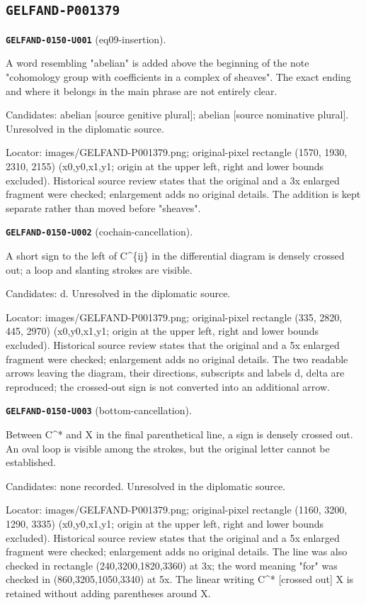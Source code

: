 \documentclass[11pt]{article}
\theoremstyle{definition}
\theoremstyle{remark}
\begin{document}
\subsection*{\texttt{GELFAND-P001379}}
\noindent\leavevmode{}\label{GELFAND-P001379:eq09-insertion:note}\textbf{\texttt{GELFAND-0150-U001}} (eq09-insertion).\par\nopagebreak[4]
A word resembling "abelian" is added above the beginning of the note "cohomology group with coefficients in a complex of sheaves". The exact ending and where it belongs in the main phrase are not entirely clear.\par
Candidates: abelian [source genitive plural]; abelian [source nominative plural]. Unresolved in the diplomatic source.\par
Locator: images/GELFAND-P001379.png; original-pixel rectangle (1570, 1930, 2310, 2155) (x0,y0,x1,y1; origin at the upper left, right and lower bounds excluded). Historical source review states that the original and a 3x enlarged fragment were checked; enlargement adds no original details. The addition is kept separate rather than moved before "sheaves".\par\medskip
\noindent\leavevmode{}\label{GELFAND-P001379:cochain-cancellation:note}\textbf{\texttt{GELFAND-0150-U002}} (cochain-cancellation).\par\nopagebreak[4]
A short sign to the left of C\textasciicircum{}\{ij\} in the differential diagram is densely crossed out; a loop and slanting strokes are visible.\par
Candidates: d. Unresolved in the diplomatic source.\par
Locator: images/GELFAND-P001379.png; original-pixel rectangle (335, 2820, 445, 2970) (x0,y0,x1,y1; origin at the upper left, right and lower bounds excluded). Historical source review states that the original and a 5x enlarged fragment were checked; enlargement adds no original details. The two readable arrows leaving the diagram, their directions, subscripts and labels d, delta are reproduced; the crossed-out sign is not converted into an additional arrow.\par\medskip
\noindent\leavevmode{}\label{GELFAND-P001379:bottom-cancellation:note}\textbf{\texttt{GELFAND-0150-U003}} (bottom-cancellation).\par\nopagebreak[4]
Between C\textasciicircum{}* and X in the final parenthetical line, a sign is densely crossed out. An oval loop is visible among the strokes, but the original letter cannot be established.\par
Candidates: none recorded. Unresolved in the diplomatic source.\par
Locator: images/GELFAND-P001379.png; original-pixel rectangle (1160, 3200, 1290, 3335) (x0,y0,x1,y1; origin at the upper left, right and lower bounds excluded). Historical source review states that the original and a 5x enlarged fragment were checked; enlargement adds no original details. The line was also checked in rectangle (240,3200,1820,3360) at 3x; the word meaning "for" was checked in (860,3205,1050,3340) at 5x. The linear writing C\textasciicircum{}* [crossed out] X is retained without adding parentheses around X.\par\medskip
\end{document}
